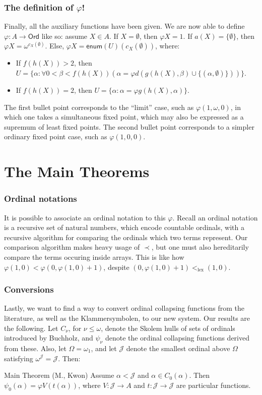 \documentclass{beamer}
\begin{document}
\begin{frame}
\frametitle{The definition of $\varphi$!}
Finally, all the auxiliary functions have been given. We are now able to define $\varphi: A \to \mathsf{Ord}$ like so: assume $X \in A$. If $X = \emptyset$, then $\varphi X = 1$. If $a(X) = \{\emptyset\}$, then $\varphi X = \omega^{c_X(\emptyset)}$. \pause Else, $\varphi X = \mathsf{enum}(U)(c_X(\emptyset))$, where:

\begin{itemize}
    \item If $f(h(X)) > 2$, then $U = \{\alpha: \forall 0 < \beta < f(h(X)) (\alpha = \varphi d(g(h(X), \beta) \cup \{(\alpha, \emptyset)\}))\}$.
    \item If $f(h(X)) = 2$, then $U = \{\alpha: \alpha = \varphi g(h(X), \alpha)\}$.
\end{itemize}

\pause

The first bullet point corresponds to the ``limit'' case, such as $\varphi(1, \omega, 0)$, in which one takes a simultaneous fixed point, which may also be expressed as a supremum of least fixed points. The second bullet point corresponds to a simpler ordinary fixed point case, such as $\varphi(1, 0, 0)$.
\end{frame}

\section{The Main Theorems}

\begin{frame}
\frametitle{Ordinal notations}
It is possible to associate an ordinal notation to this $\varphi$. Recall an ordinal notation is a recursive set of natural numbers, which encode countable ordinals, with a recursive algorithm for comparing the ordinals which two terms represent. \pause Our comparison algorithm makes heavy usage of $\prec$, but one must also hereditarily compare the terms occuring inside arrays. This is like how $\varphi(1,0) < \varphi(0,\varphi(1,0)+1)$, despite $(0,\varphi(1,0)+1) <_{\mathrm{lex}} (1,0)$. 
\end{frame}

\begin{frame}
\frametitle{Conversions}
Lastly, we want to find a way to convert ordinal collapsing functions from the literature, as well as the Klammersymbolen, to our new system. Our results are the following. Let $C_\nu$, for $\nu \leq \omega$, denote the Skolem hulls of sets of ordinals introduced by Buchholz, and $\psi_\nu$ denote the ordinal collapsing functions derived from these. Also, let $\Omega = \omega_1$, and let $\mathcal{J}$ denote the smallest ordinal above $\Omega$ satisfying $\omega^\mathcal{J} = \mathcal{J}$. Then:

\begin{block}{Main Theorem (M., Kwon)}
Assume $\alpha < \mathcal{J}$ and $\alpha \in C_0(\alpha)$. Then $\psi_0(\alpha) = \varphi V(t(\alpha))$, where $V: \mathcal{J} \to A$ and $t: \mathcal{J} \to \mathcal{J}$ are particular functions.
\end{block}
\end{frame}
\end{document}

